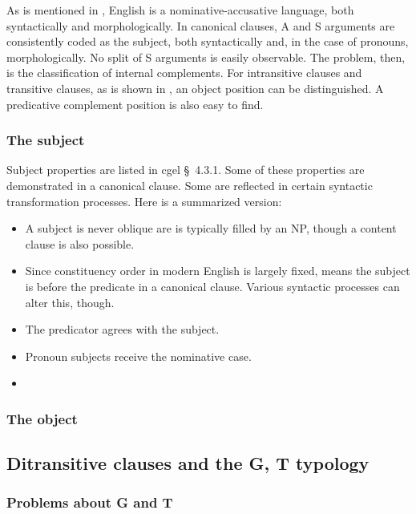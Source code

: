 \documentclass{article}
\newcommand*{\citesec}[1]{\S~{#1}}
\begin{document}
As is mentioned in ,
English is a nominative-accusative language,
both syntactically and morphologically.
In canonical clauses,
A and S arguments are consistently coded as the subject, both syntactically and, 
in the case of pronouns, morphologically.
No split of S arguments is easily observable. %
The problem, then, is the classification of internal complements.
For intransitive clauses and transitive clauses,
as is shown in ,
an object position can be distinguished.
A predicative complement position is also easy to find. %

\subsubsection{The subject} \label{sec:subject}

Subject properties are listed in \ac{cgel} \citesec{4.3.1}. 
Some of these properties are demonstrated in a canonical clause.
Some are reflected in certain syntactic transformation processes.
Here is a summarized version:
\begin{itemize}
    \item A subject is never oblique are is typically filled by an NP, though a content clause is also possible.
    \item Since constituency order in modern English is largely fixed,
     means the subject is before the predicate in a canonical clause.
    Various syntactic processes can alter this, though.
    \item The predicator agrees with the subject.
    \item Pronoun subjects receive the nominative case.
    \item  
\end{itemize}

\subsubsection{The object}

\subsection{Ditransitive clauses and the G, T typology}

\subsubsection{Problems about G and T}
\end{document}
